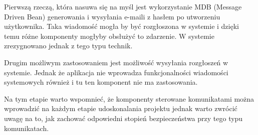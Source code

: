 Pierwszą rzeczą, która nasuwa się na myśl jest wykorzystanie MDB (Message Driven Bean) generowania i wysyłania e-maili z hasłem po utworzeniu użytkownika. Taka wiadomość mogła by być rozgłoszona w systemie i dzięki temu różne komponenty mogłyby obsłużyć to zdarzenie. W systemie zrezygnowano jednak z tego typu technik.

Drugim możliwym zastosowaniem jest możliwość wysyłania rozgłoszeń w systemie. Jednak że aplikacja nie wprowadza funkcjonalności wiadomości systemowych również i tu ten komponent nie ma zastosowania.

Na tym etapie warto wspomnieć, że komponenty sterowane komunikatami można wprowadzić na każdym etapie udoskonalania projektu jednak warto zwrócić uwagę na to, jak zachować odpowiedni stopień bezpieczeństwa przy tego typu komunikatach.